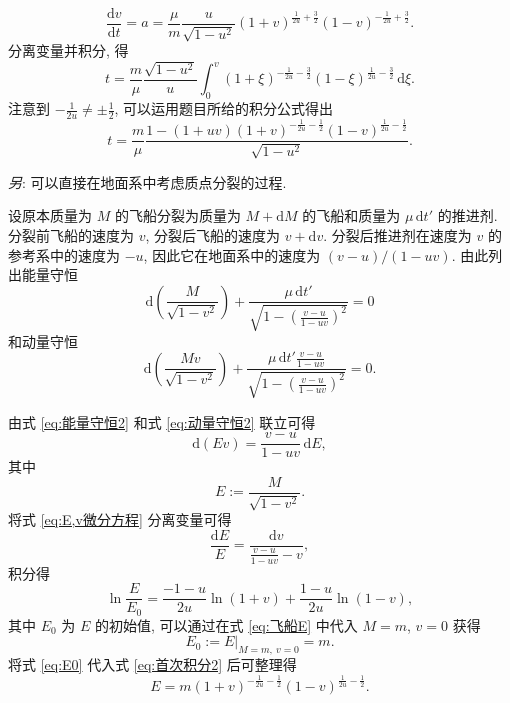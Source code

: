 \documentclass{article}
\begin{document}
\begin{equation}
	\frac{\mathrm dv}{\mathrm dt}=a=\frac\mu m\frac u{\sqrt{1-u^2}}
	\left(1+v\right)^{\frac1{2u}+\frac32}\left(1-v\right)^{-\frac1{2u}+\frac32}.
\end{equation}
分离变量并积分, 得
\begin{equation}
	\label{eq:使用积分公式前}
	t=\frac m\mu\frac{\sqrt{1-u^2}}u\int_0^v\left(1+\xi\right)^{-\frac1{2u}-\frac32}
	\left(1-\xi\right)^{\frac1{2u}-\frac32}\,\mathrm d\xi.
\end{equation}
注意到 $-\frac1{2u}\ne\pm\frac12$, 可以运用题目所给的积分公式得出
\begin{equation}
	t=\frac m\mu\frac{1-\left(1+uv\right)\left(1+v\right)^{-\frac1{2u}-\frac12}
	\left(1-v\right)^{\frac1{2u}-\frac12}}{\sqrt{1-u^2}}.
\end{equation}

\textit{另}: 可以直接在地面系中考虑质点分裂的过程.

设原本质量为 $M$ 的飞船分裂为质量为 $M+\mathrm dM$ 的飞船和质量为 $\mu\,\mathrm dt'$ 的推进剂.
分裂前飞船的速度为 $v$, 分裂后飞船的速度为 $v+\mathrm dv$.
分裂后推进剂在速度为 $v$ 的参考系中的速度为 $-u$, 因此它在地面系中的速度为
$\left(v-u\right)/\left(1-uv\right)$.
由此列出能量守恒
\begin{equation}
	\label{eq:能量守恒2}
	\mathrm d\!\left(\frac M{\sqrt{1-v^2}}\right)+
	\frac{\mu\,\mathrm dt'}{\sqrt{1-\left(\frac{v-u}{1-uv}\right)^2}}=0
\end{equation}
和动量守恒
\begin{equation}
	\label{eq:动量守恒2}
	\mathrm d\!\left(\frac{Mv}{\sqrt{1-v^2}}\right)+
	\frac{\mu\,\mathrm dt'\frac{v-u}{1-uv}}{\sqrt{1-\left(\frac{v-u}{1-uv}\right)^2}}=0.
\end{equation}

由式 \ref{eq:能量守恒2} 和式 \ref{eq:动量守恒2} 联立可得
\begin{equation}
	\label{eq:E,v微分方程}
	\mathrm d\!\left(Ev\right)=\frac{v-u}{1-uv}\,\mathrm dE,
\end{equation}
其中
\begin{equation}
	\label{eq:飞船E}
	E:=\frac M{\sqrt{1-v^2}}.
\end{equation}
将式 \ref{eq:E,v微分方程} 分离变量可得
\begin{equation}
	\frac{\mathrm dE}E=\frac{\mathrm dv}{\frac{v-u}{1-uv}-v},
\end{equation}
积分得
\begin{equation}
	\label{eq:首次积分2}
	\ln\frac E{E_0}=\frac{-1-u}{2u}\ln\!\left(1+v\right)
	+\frac{1-u}{2u}\ln\!\left(1-v\right),
\end{equation}
其中 $E_0$ 为 $E$ 的初始值, 可以通过在式 \ref{eq:飞船E} 中代入 $M=m$, $v=0$ 获得
\begin{equation}
	\label{eq:E0}
	E_0:=\left.E\right|_{M=m,~v=0}=m.
\end{equation}
将式 \ref{eq:E0} 代入式 \ref{eq:首次积分2} 后可整理得
\begin{equation}
	\label{eq:E关于v}
	E=m\left(1+v\right)^{-\frac1{2u}-\frac12}\left(1-v\right)^{\frac1{2u}-\frac12}.
\end{equation}
\end{document}
